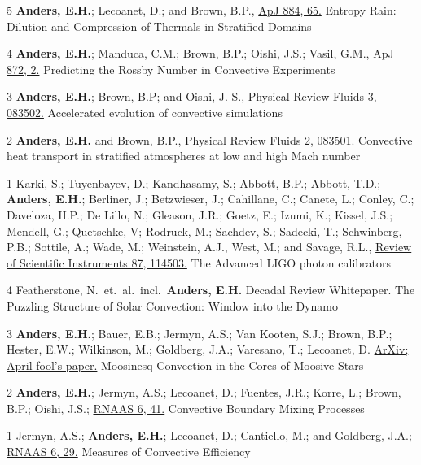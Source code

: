 	  {5}
	  {
		  \textbf{Anders, E.H.}; Lecoanet, D.; and Brown, B.P., 
		  \href{https://iopscience.iop.org/article/10.3847/1538-4357/ab3644}{ApJ 884, 65.}
	  }
	  {Entropy Rain: Dilution and Compression of Thermals in Stratified Domains}

\cvpub{}
	  {4}
	  {
		  \textbf{Anders, E.H.}; Manduca, C.M.; Brown, B.P.; Oishi, J.S.; Vasil, G.M., 
		  \href{https://iopscience.iop.org/article/10.3847/1538-4357/aaff61}{ApJ 872, 2.}
	  }
	  {Predicting the Rossby Number in Convective Experiments}

	  {3}
	  {
		  \textbf{Anders, E.H.}; Brown, B.P; and Oishi, J. S.,
		  \href{https://journals.aps.org/prfluids/abstract/10.1103/PhysRevFluids.3.083502}{Physical Review Fluids 3, 083502.}
	  }
	  {Accelerated evolution of convective simulations}

	  {2}
	  {
		  \textbf{Anders, E.H.} and Brown, B.P.,
		  \href{https://journals.aps.org/prfluids/abstract/10.1103/PhysRevFluids.2.083501}{Physical Review Fluids 2, 083501.}
	  }
	  {Convective heat transport in stratified atmospheres at low and high Mach number}

	  {1}
	  {
			Karki, S.; Tuyenbayev, D.; Kandhasamy, S.; Abbott, B.P.; Abbott, T.D.; \textbf{Anders, E.H.};
			Berliner, J.; Betzwieser, J.; Cahillane, C.; Canete, L.; Conley, C.; Daveloza, H.P.; De Lillo, N.;
			Gleason, J.R.; Goetz, E.; Izumi, K.; Kissel, J.S.; Mendell, G.; Quetschke, V; Rodruck, M.; Sachdev, S.;
			Sadecki, T.; Schwinberg, P.B.; Sottile, A.; Wade, M.; Weinstein, A.J., West, M.; and Savage, R.L.,
			\href{https://aip.scitation.org/doi/10.1063/1.4967303}{Review of Scientific Instruments 87, 114503.}
	  }
	  {The Advanced LIGO photon calibrators}

\vspace{0.3cm}
	  {4}
	  {
		Featherstone, N.~et.~al.~incl.~\textbf{Anders, E.H.}
        Decadal Review Whitepaper. 
	  }
	  {
            The Puzzling Structure of Solar Convection: Window into the Dynamo
      }


\cvpub{}
	  {3}
	  {
		\textbf{Anders, E.H.}; Bauer, E.B.; Jermyn, A.S.; Van Kooten, S.J.; Brown, B.P.; Hester, E.W.; Wilkinson, M.; Goldberg, J.A.; Varesano, T.; Lecoanet, D.
        \href{https://arxiv.org/abs/2204.00002}{ArXiv; April fool's paper.}
	  }
	  {Moosinesq Convection in the Cores of Moosive Stars}

\cvpub{}
	  {2}
	  {
		\textbf{Anders, E.H.}; Jermyn, A.S.; Lecoanet, D.; Fuentes, J.R.; Korre, L.; Brown, B.P.; Oishi, J.S.; 
        \href{https://iopscience.iop.org/article/10.3847/2515-5172/ac5892}{RNAAS 6, 41.}
	  }
	  {Convective Boundary Mixing Processes}

\cvpub{}
	  {1}
	  {
		Jermyn, A.S.; \textbf{Anders, E.H.}; Lecoanet, D.; Cantiello, M.; and Goldberg, J.A.; 
        \href{https://iopscience.iop.org/article/10.3847/2515-5172/ac531e}{RNAAS 6, 29.}
	  }
	  {Measures of Convective Efficiency}


